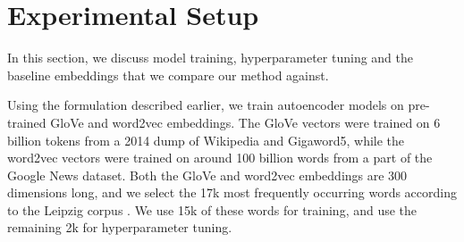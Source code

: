 \documentclass[letterpaper]{article} %
\begin{document}

\section{Experimental Setup}
\label{sec:eval}

In this section, we discuss model training, hyperparameter tuning and the baseline embeddings that we compare our method against.

Using the formulation described earlier,
 we train autoencoder models on pre-trained GloVe and word2vec embeddings. The GloVe vectors were trained on 6 billion tokens from a 2014 dump of Wikipedia and Gigaword5, while the word2vec vectors were trained on around 100 billion words from a part of the Google News dataset. Both the GloVe and word2vec embeddings are 300 dimensions long, and we select the 17k most frequently occurring words according to the Leipzig corpus \cite{goldhahn2012building}. We use 15k of these words for training, and use the remaining 2k for hyperparameter tuning.
\end{document}
